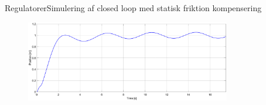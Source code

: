 \begin{frame}{Regulatorer}{Simulering af closed loop med statisk friktion kompensering}
\vspace{1.5cm}
\begin{figure}[H]
\centering
\includegraphics[width=0.8\textwidth]{Billeder/Thomas/100mA}
\end{figure}
\end{frame}








